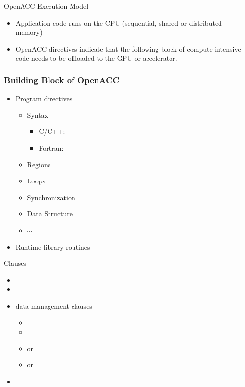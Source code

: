 \documentclass[10pt,t]{beamer}
\begin{document}
\begin{frame}{ OpenACC Execution Model}
  \begin{exampleblock}{}
    \begin{itemize}
      \item Application code runs on the CPU (sequential, shared or distributed memory)
      \item OpenACC directives indicate that the following block of compute intensive code needs to be offloaded to the GPU or accelerator.
    \end{itemize}
    \vspace{-0.5cm}
    
  \end{exampleblock}
\end{frame}

\begin{frame}[fragile]
  \frametitle{\small Building Block of OpenACC}
  \begin{itemize}
  \item Program directives
    \begin{itemize}
    \item Syntax
      \begin{itemize}
      \item C/C++: 
      \item Fortran: 
      \end{itemize}
    \item Regions
    \item Loops
    \item Synchronization
    \item Data Structure
    \item $\cdots$
    \end{itemize}
  \item Runtime library routines
  \end{itemize}
\end{frame}

\begin{frame}[fragile]{\small Clauses}
  \begin{itemize}
    \item {}
    \item {}
    \item data management clauses
    \begin{itemize}
      \item {}
      \item {}
      \item {} or 
      \item {} or 
    \end{itemize}
    \item {}
  \end{itemize}
\end{frame}
\end{document}
